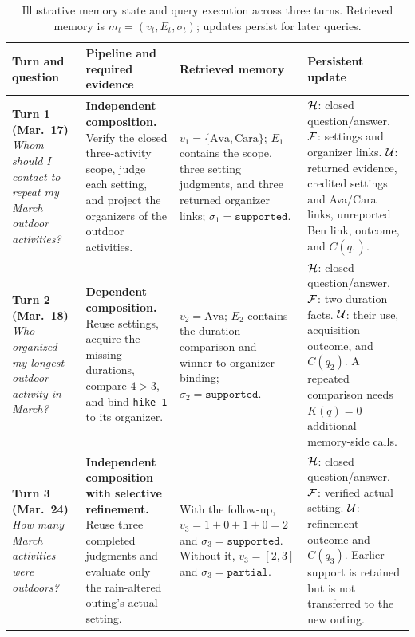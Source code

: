 \begin{table}[t]
  \centering
  \small
  \caption{Illustrative memory state and query execution across three turns.
  Retrieved memory is $m_t=(v_t,E_t,\sigma_t)$; updates persist for later queries.}
  \label{tbl:evolution-case}
  \setlength{\tabcolsep}{5pt}
  \renewcommand{\arraystretch}{1.12}
  \begin{tabular}{@{}>{\raggedright\arraybackslash}p{}
                      >{\raggedright\arraybackslash}p{}
                      >{\raggedright\arraybackslash}p{}
                      >{\raggedright\arraybackslash}p{}@{}}
    \toprule
    \textbf{Turn and question} & \textbf{Pipeline and required evidence}
      & \textbf{Retrieved memory} & \textbf{Persistent update} \\
    \midrule
    \cellcolor{lightblue}\textbf{Turn 1 (Mar.~17)}\newline
    \emph{Whom should I contact to repeat my March outdoor activities?}
      & \textbf{Independent composition.} Verify the closed three-activity
        scope, judge each setting, and project the organizers of the outdoor
        activities.
      & $v_1=\{\text{Ava},\text{Cara}\}$; $E_1$ contains the scope, three
        setting judgments, and three returned organizer links;
        $\sigma_1=\texttt{supported}$.
      & $\mathcal{H}$: closed question/answer. $\mathcal{F}$: settings and organizer links.
        $\mathcal{U}$: returned evidence, credited settings and Ava/Cara links,
        unreported Ben link, outcome, and $C(q_1)$. \\
    \addlinespace[2pt]
    \cellcolor{lightorange}\textbf{Turn 2 (Mar.~18)}\newline
    \emph{Who organized my longest outdoor activity in March?}
      & \textbf{Dependent composition.} Reuse settings, acquire the missing
        durations, compare $4>3$, and bind \texttt{hike-1} to its organizer.
      & $v_2=\text{Ava}$; $E_2$ contains the duration comparison and
        winner-to-organizer binding; $\sigma_2=\texttt{supported}$.
      & $\mathcal{H}$: closed question/answer. $\mathcal{F}$: two duration facts.
        $\mathcal{U}$: their use, acquisition outcome, and $C(q_2)$. A repeated
        comparison needs $K(q)=0$ additional memory-side calls. \\
    \addlinespace[2pt]
    \cellcolor{lightgreen}\textbf{Turn 3 (Mar.~24)}\newline
    \emph{How many March activities were outdoors?}
      & \textbf{Independent composition with selective refinement.} Reuse
        three completed judgments and evaluate only the rain-altered outing's
        actual setting.
      & With the follow-up, $v_3=1+0+1+0=2$ and
        $\sigma_3=\texttt{supported}$. Without it, $v_3=[2,3]$ and
        $\sigma_3=\texttt{partial}$.
      & $\mathcal{H}$: closed question/answer. $\mathcal{F}$: verified actual setting.
        $\mathcal{U}$: refinement outcome and $C(q_3)$. Earlier support is retained
        but is not transferred to the new outing. \\
    \bottomrule
  \end{tabular}
\end{table}

